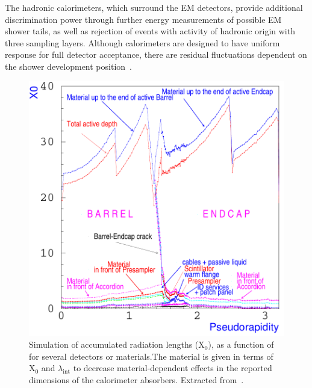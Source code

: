 The hadronic calorimeters, which surround the EM detectors,
provide additional discrimination power through further energy measurements of
possible EM shower tails, as well as rejection of events with activity of
hadronic origin with three sampling layers. Although calorimeters are designed 
to have uniform response for full detector acceptance, there are residual fluctuations 
dependent on the shower development position~\cite{Wigmans2017}.



\begin{figure}[ht]
  \centering
  \includegraphics[width=.5\textwidth]{sections/context/figures/cal_em_x0.pdf}
  \caption{Simulation of accumulated radiation lengths ($\text{X}_0$), as a function of \abseta for several detectors or materials.The material is given in
terms of $\text{X}_0$ and $\lambda_{\text{int}}$ to decrease material-dependent
effects in the reported dimensions of the calorimeter
absorbers.%
  Extracted from~\cite{cal_tdr}.}%
  \label{fig:cal_em_x0}
  \end{figure}
  

